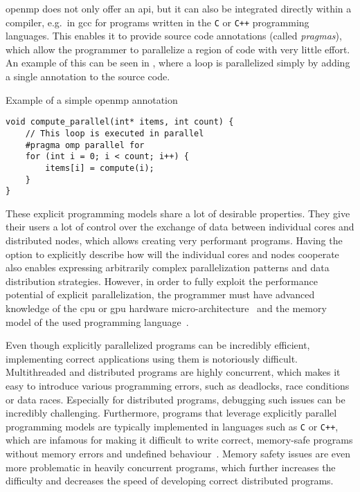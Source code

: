 \begin{description}
		\gls{openmp} does not only offer an \gls{api}, but it can also be integrated
		directly within a compiler, e.g.\ in \gls{gcc} for programs written in the
		\texttt{C} or \texttt{C++} programming languages. This enables it to provide
		source code annotations (called \emph{pragmas}), which allow the programmer to parallelize
		a region of code with very little effort. An example of this can be seen in ,
		where a loop is parallelized simply by adding a single annotation to the source code.

		\begin{listing}
			\caption{Example of a simple \gls{openmp} annotation}
			\label{lst:openmp-example}
			\begin{verbatim}
void compute_parallel(int* items, int count) {
    // This loop is executed in parallel
    #pragma omp parallel for
    for (int i = 0; i < count; i++) {
        items[i] = compute(i);
    }
}
        \end{verbatim}
		\end{listing}
\end{description}

These explicit programming models share a lot of desirable properties. They give their users a lot
of control over the exchange of data between individual cores and distributed nodes, which allows
creating very performant programs. Having the option to explicitly describe how will the individual
cores and nodes cooperate also enables expressing arbitrarily complex parallelization patterns and
data distribution strategies. However, in order to fully exploit the performance potential of
explicit parallelization, the programmer must have advanced knowledge of the \gls{cpu}
or \gls{gpu} hardware micro-architecture~\cite{intel_developer_manual} and the memory model
of the used programming language~\cite{cpp11_standard}.

Even though explicitly parallelized programs can be incredibly efficient, implementing correct
applications using them is notoriously difficult. Multithreaded and distributed programs are highly
concurrent, which makes it easy to introduce various programming errors, such as deadlocks, race
conditions or data races. Especially for distributed programs, debugging such issues can be
incredibly challenging. Furthermore, programs that leverage explicitly parallel programming models
are typically implemented in languages such as \texttt{C} or \texttt{C++},
which are infamous for making it difficult to write correct, memory-safe programs without memory
errors and undefined behaviour~\cite{memory_safety_report}. Memory safety issues are even more
problematic in heavily concurrent programs, which further increases the difficulty and decreases
the speed of developing correct distributed programs.

